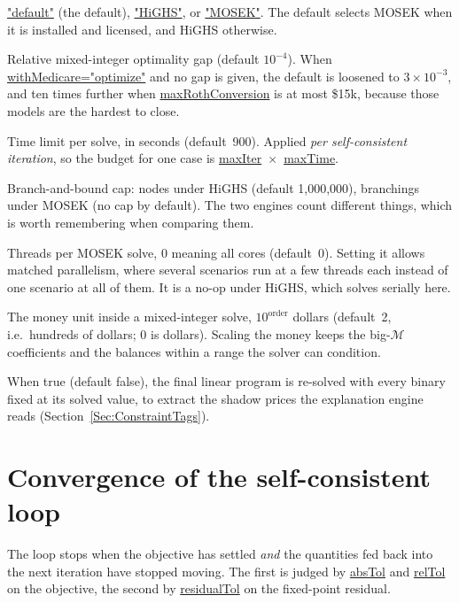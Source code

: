 \documentclass[fleqn,12pt]{report}
\newcommand{\code}[1]{\url{#1}}
\begin{document}
\begin{description}[style=nextline, leftmargin=1.5cm, font=\ttfamily]
\item[solver]
\code{"default"} (the default), \code{"HiGHS"}, or \code{"MOSEK"}.  The
default selects MOSEK when it is installed and licensed, and HiGHS otherwise.
\item[gap]
Relative mixed-integer optimality gap (default $10^{-4}$).  When
\code{withMedicare="optimize"} and no gap is given, the default is loosened to
$3\times10^{-3}$, and ten times further when \code{maxRothConversion} is at most
\$15k, because those models are the hardest to close.
\item[maxTime]
Time limit per solve, in seconds (default~900).  Applied \emph{per
self-consistent iteration}, so the budget for one case is
\code{maxIter}~$\times$~\code{maxTime}.
\item[mipMaxNodes]
Branch-and-bound cap: nodes under HiGHS (default 1,000,000), branchings under
MOSEK (no cap by default).  The two engines count different things, which is
worth remembering when comparing them.
\item[numThreads]
Threads per MOSEK solve, 0 meaning all cores (default~0).  Setting it allows
matched parallelism, where several scenarios run at a few threads each instead of
one scenario at all of them.  It is a no-op under HiGHS, which solves serially
here.
\item[mipScaleOrder]
The money unit inside a mixed-integer solve, $10^{\textrm{order}}$ dollars
(default~2, i.e.\ hundreds of dollars; 0 is dollars).  Scaling the money keeps
the big-$\mathcal{M}$ coefficients and the balances within a range the solver
can condition.
\item[withDuals]
When true (default false), the final linear program is re-solved with every
binary fixed at its solved value, to extract the shadow prices the explanation
engine reads (Section~\ref{Sec:ConstraintTags}).
\end{description}

\section{Convergence of the self-consistent loop}

The loop stops when the objective has settled \emph{and} the quantities fed back
into the next iteration have stopped moving.  The first is judged by
\code{absTol} and \code{relTol} on the objective, the second by
\code{residualTol} on the fixed-point residual.
\end{document}
